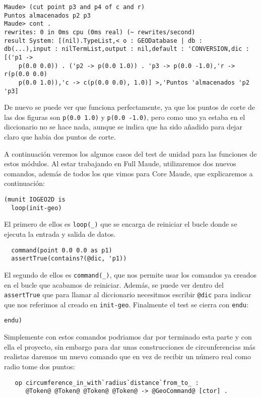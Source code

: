 {\codesize
\begin{verbatim}
Maude> (cut point p3 and p4 of c and r)
Puntos almacenados p2 p3
Maude> cont .
rewrites: 0 in 0ms cpu (0ms real) (~ rewrites/second)
result System: [(nil).TypeList,< o : GEODatabase | db : 
db(...),input : nilTermList,output : nil,default : 'CONVERSION,dic : [('p1 ->
    p(0.0 0.0)) . ('p2 -> p(0.0 1.0)) . 'p3 -> p(0.0 -1.0),'r -> r(p(0.0 0.0)
    p(0.0 1.0)),'c -> c(p(0.0 0.0), 1.0)] >,'Puntos 'almacenados 'p2 'p3]
\end{verbatim}
}

De nuevo se puede ver que funciona perfectamente, ya que los puntos de corte de las dos figuras son \verb"p(0.0 1.0)" y \verb"p(0.0 -1.0)", pero como uno ya estaba en el diccionario no se hace nada, aunque se indica que ha sido añadido para dejar claro que habia dos puntos de corte.\par

A continuación veremos los algunos casos del test de unidad para las funciones de estos módulos. Al estar trabajando en Full Maude, utilizaremos dos nuevos comandos, además de todos los que vimos para Core Maude, que explicaremos a continuación:
{\codesize
\begin{verbatim}
(munit IOGEO2D is
  loop(init-geo)
\end{verbatim}
}
El primero de ellos es \verb"loop(_)" que se encarga de reiniciar el bucle donde se ejecuta la entrada y salida de datos.\par
{\codesize
\begin{verbatim}
  command(point 0.0 0.0 as p1)
  assertTrue(contains?(@dic, 'p1))
\end{verbatim}
}
El segundo de ellos es \verb"command(_)", que nos permite usar los comandos ya creados en el bucle que acabamos de reiniciar. Además, se puede ver dentro del \verb"assertTrue" que para llamar al diccionario necesitmos escribir \verb"@dic" para indicar que nos referimos al creado en \verb"init-geo". Finalmente el test se cierra con \verb"endu":\par
{\codesize
\begin{verbatim}
endu)
\end{verbatim}
}

Simplemente con estos comandos podriamos dar por terminado esta parte y con ella el proyecto, sin embargo para dar unas construcciones de circunferencias más realistas daremos un nuevo comando que en vez de recibir un número real como radio tome dos puntos:

{\codesize
\begin{verbatim}
   op circumference_in_with`radius`distance`from_to_ : 
      @Token@ @Token@ @Token@ @Token@ -> @GeoCommand@ [ctor] .
\end{verbatim}
}

